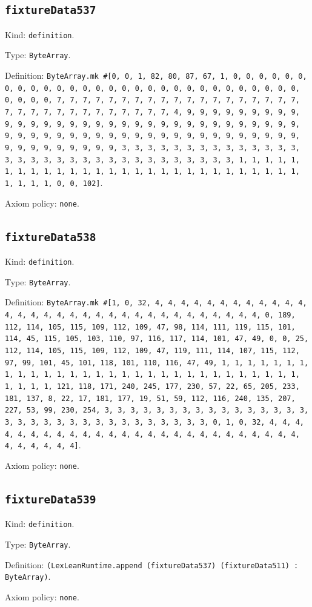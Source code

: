 \documentclass[11pt]{article}
\begin{document}
\subsection*{\texttt{fixtureData537}}
\noindent Kind: \texttt{definition}.\par
\noindent Type: \texttt{ByteArray}.\par
\noindent Definition: \texttt{ByteArray.mk \#[0, 0, 1, 82, 80, 87, 67, 1, 0, 0, 0, 0, 0, 0, 0, 0, 0, 0, 0, 0, 0, 0, 0, 0, 0, 0, 0, 0, 0, 0, 0, 0, 0, 0, 0, 0, 0, 0, 0, 0, 0, 7, 7, 7, 7, 7, 7, 7, 7, 7, 7, 7, 7, 7, 7, 7, 7, 7, 7, 7, 7, 7, 7, 7, 7, 7, 7, 7, 7, 7, 7, 7, 7, 4, 9, 9, 9, 9, 9, 9, 9, 9, 9, 9, 9, 9, 9, 9, 9, 9, 9, 9, 9, 9, 9, 9, 9, 9, 9, 9, 9, 9, 9, 9, 9, 9, 9, 9, 9, 9, 9, 9, 9, 9, 9, 9, 9, 9, 9, 9, 9, 9, 9, 9, 9, 9, 9, 9, 9, 9, 9, 9, 9, 9, 9, 9, 9, 9, 3, 3, 3, 3, 3, 3, 3, 3, 3, 3, 3, 3, 3, 3, 3, 3, 3, 3, 3, 3, 3, 3, 3, 3, 3, 3, 3, 3, 3, 3, 3, 3, 1, 1, 1, 1, 1, 1, 1, 1, 1, 1, 1, 1, 1, 1, 1, 1, 1, 1, 1, 1, 1, 1, 1, 1, 1, 1, 1, 1, 1, 1, 1, 1, 0, 0, 102]}.\par
\noindent Axiom policy: \texttt{none}.\par
\subsection*{\texttt{fixtureData538}}
\noindent Kind: \texttt{definition}.\par
\noindent Type: \texttt{ByteArray}.\par
\noindent Definition: \texttt{ByteArray.mk \#[1, 0, 32, 4, 4, 4, 4, 4, 4, 4, 4, 4, 4, 4, 4, 4, 4, 4, 4, 4, 4, 4, 4, 4, 4, 4, 4, 4, 4, 4, 4, 4, 4, 4, 4, 0, 189, 112, 114, 105, 115, 109, 112, 109, 47, 98, 114, 111, 119, 115, 101, 114, 45, 115, 105, 103, 110, 97, 116, 117, 114, 101, 47, 49, 0, 0, 25, 112, 114, 105, 115, 109, 112, 109, 47, 119, 111, 114, 107, 115, 112, 97, 99, 101, 45, 101, 118, 101, 110, 116, 47, 49, 1, 1, 1, 1, 1, 1, 1, 1, 1, 1, 1, 1, 1, 1, 1, 1, 1, 1, 1, 1, 1, 1, 1, 1, 1, 1, 1, 1, 1, 1, 1, 1, 1, 1, 121, 118, 171, 240, 245, 177, 230, 57, 22, 65, 205, 233, 181, 137, 8, 22, 17, 181, 177, 19, 51, 59, 112, 116, 240, 135, 207, 227, 53, 99, 230, 254, 3, 3, 3, 3, 3, 3, 3, 3, 3, 3, 3, 3, 3, 3, 3, 3, 3, 3, 3, 3, 3, 3, 3, 3, 3, 3, 3, 3, 3, 3, 3, 3, 0, 1, 0, 32, 4, 4, 4, 4, 4, 4, 4, 4, 4, 4, 4, 4, 4, 4, 4, 4, 4, 4, 4, 4, 4, 4, 4, 4, 4, 4, 4, 4, 4, 4, 4, 4]}.\par
\noindent Axiom policy: \texttt{none}.\par
\subsection*{\texttt{fixtureData539}}
\noindent Kind: \texttt{definition}.\par
\noindent Type: \texttt{ByteArray}.\par
\noindent Definition: \texttt{(LexLeanRuntime.append (fixtureData537) (fixtureData511) : ByteArray)}.\par
\noindent Axiom policy: \texttt{none}.\par
\end{document}

